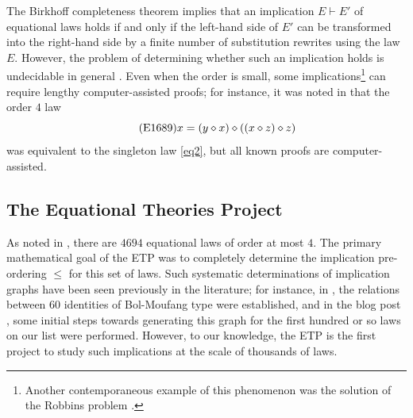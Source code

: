 The Birkhoff completeness theorem \cite[Th. 3.5.14]{term-rewriting} implies that an implication $E \vdash E'$ of equational laws holds if and only if the left-hand side of $E'$ can be transformed into the right-hand side by a finite number of substitution rewrites using the law $E$. However, the problem of determining whether such an implication holds is undecidable in general \cite{mckenzie}. Even when the order is small, some implications\footnote{Another contemporaneous example of this phenomenon was the solution of the Robbins problem \cite{robbins}.} can require lengthy computer-assisted proofs; for instance, it was noted in \cite{Kisielewicz2} that the order $4$ law
\begin{equation}\label{eq1689}\tag{E1689}
    x = (y \diamond x) \diamond ((x \diamond z) \diamond z)
\end{equation}
was equivalent to the singleton law \eqref{eq2}, but all known proofs are computer-assisted.

\subsection{The Equational Theories Project}

As noted in , there are $4694$ equational laws of order at most $4$. The primary mathematical goal of the ETP was to completely determine the implication pre-ordering $\leq$ for this set of laws. Such systematic determinations of implication graphs have been seen previously in the literature; for instance, in \cite{phillips-vojtechovsky}, the relations between $60$ identities of Bol-Moufang type were established, and in the blog post \cite[\S 17]{Wolfram_2022}, some initial steps towards generating this graph for the first hundred or so laws on our list were performed. However, to our knowledge, the ETP is the first project to study such implications at the scale of thousands of laws.

